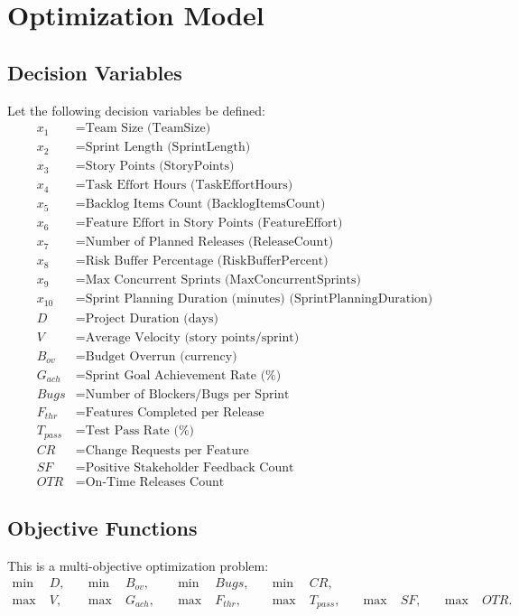 \documentclass{article}
\begin{document}
\section*{Optimization Model}

\subsection*{Decision Variables}
Let the following decision variables be defined:
\[
\begin{aligned}
x_1 &= \text{Team Size (TeamSize)} \\
x_2 &= \text{Sprint Length (SprintLength)} \\
x_3 &= \text{Story Points (StoryPoints)} \\
x_4 &= \text{Task Effort Hours (TaskEffortHours)} \\
x_5 &= \text{Backlog Items Count (BacklogItemsCount)} \\
x_6 &= \text{Feature Effort in Story Points (FeatureEffort)} \\
x_7 &= \text{Number of Planned Releases (ReleaseCount)} \\
x_8 &= \text{Risk Buffer Percentage (RiskBufferPercent)} \\
x_9 &= \text{Max Concurrent Sprints (MaxConcurrentSprints)} \\
x_{10} &= \text{Sprint Planning Duration (minutes) (SprintPlanningDuration)} \\
D &= \text{Project Duration (days)} \\
V &= \text{Average Velocity (story points/sprint)} \\
B_{ov} &= \text{Budget Overrun (currency)} \\
G_{ach} &= \text{Sprint Goal Achievement Rate (\%)} \\
Bugs &= \text{Number of Blockers/Bugs per Sprint} \\
F_{thr} &= \text{Features Completed per Release} \\
T_{pass} &= \text{Test Pass Rate (\%)} \\
CR &= \text{Change Requests per Feature} \\
SF &= \text{Positive Stakeholder Feedback Count} \\
OTR &= \text{On-Time Releases Count}
\end{aligned}
\]

\subsection*{Objective Functions}
This is a multi-objective optimization problem:
\[
\begin{aligned}
\min\;& D, \quad &\min\;& B_{ov}, \quad &\min\;& Bugs, \quad &\min\;& CR, \\
\max\;& V, \quad &\max\;& G_{ach}, \quad &\max\;& F_{thr}, \quad &\max\;& T_{pass}, \quad &\max\;& SF, \quad &\max\;& OTR.
\end{aligned}
\]
\end{document}
